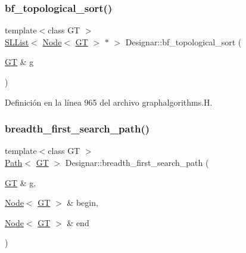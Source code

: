 \mbox{\label{namespace_designar_a07df9972ab6dffccd12e4fffa2ff13c1}} 
\subsubsection{\texorpdfstring{bf\+\_\+topological\+\_\+sort()}{bf\_topological\_sort()}}
{\footnotesize\ttfamily template$<$class GT $>$ \\
\hyperlink{class_designar_1_1_s_l_list}{S\+L\+List}$<$ \hyperlink{namespace_designar_a5af326c65aa2bd26b26c410f2030d09e}{Node}$<$ \hyperlink{demo-buildgraph_8_c_a3001c40d2c31ca87ed96cd7d1334a55e}{GT} $>$ $\ast$ $>$ Designar\+::bf\+\_\+topological\+\_\+sort (\begin{DoxyParamCaption}\item[{\hyperlink{demo-buildgraph_8_c_a3001c40d2c31ca87ed96cd7d1334a55e}{GT} \&}]{g }\end{DoxyParamCaption})}



Definición en la línea 965 del archivo graphalgorithms.\+H.

\mbox{\label{namespace_designar_ae3e6a7d2cf21c1c23ea159ac3e0cef6a}} 
\subsubsection{\texorpdfstring{breadth\+\_\+first\+\_\+search\+\_\+path()}{breadth\_first\_search\_path()}}
{\footnotesize\ttfamily template$<$class GT $>$ \\
\hyperlink{class_designar_1_1_path}{Path}$<$ \hyperlink{demo-buildgraph_8_c_a3001c40d2c31ca87ed96cd7d1334a55e}{GT} $>$ Designar\+::breadth\+\_\+first\+\_\+search\+\_\+path (\begin{DoxyParamCaption}\item[{\hyperlink{demo-buildgraph_8_c_a3001c40d2c31ca87ed96cd7d1334a55e}{GT} \&}]{g,  }\item[{\hyperlink{namespace_designar_a5af326c65aa2bd26b26c410f2030d09e}{Node}$<$ \hyperlink{demo-buildgraph_8_c_a3001c40d2c31ca87ed96cd7d1334a55e}{GT} $>$ \&}]{begin,  }\item[{\hyperlink{namespace_designar_a5af326c65aa2bd26b26c410f2030d09e}{Node}$<$ \hyperlink{demo-buildgraph_8_c_a3001c40d2c31ca87ed96cd7d1334a55e}{GT} $>$ \&}]{end }\end{DoxyParamCaption})}



